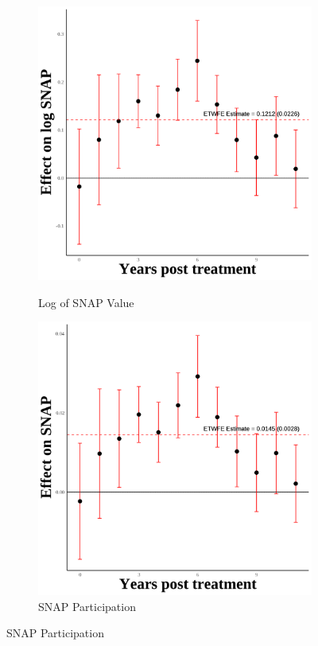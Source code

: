 \documentclass[12pt,english]{article}
\begin{document}
\begin{figure}[H]
  \begin{subfigure}[b]{0.3\textwidth}
    \centering
    \caption{Log of SNAP Value}
    \includegraphics[width=\linewidth]{figures/plot44-ln_snap_event_study-secgen-wh.png}
    \label{fig:ln-snap-secgen-wh}
  \end{subfigure}
  \hfill
  \begin{subfigure}[b]{0.3\textwidth}
    \centering
    \caption{SNAP Participation}
    \includegraphics[width=\linewidth]{figures/plot45-snap_event_study-secgen-wh.png}

\end{subfigure}
\end{figure}
\end{document}
